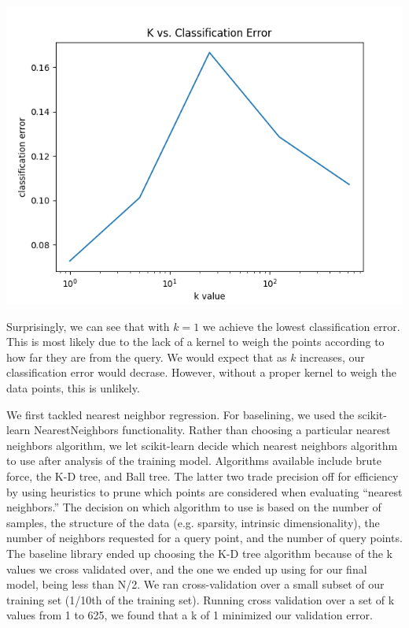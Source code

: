 \documentclass{article} %
\begin{document}
\includegraphics[width=\textwidth]{k-nn.png}

Surprisingly, we can see that with $k = 1$ we achieve the lowest classification
error. This is most likely due to the lack of a kernel to weigh the points
according to how far they are from the query. We would expect that as $k$
increases, our classification error would decrase. However, without a
proper kernel to weigh the data points, this is unlikely.

We first tackled nearest neighbor regression. For baselining, we used
the scikit-learn NearestNeighbors functionality. Rather than choosing a
particular nearest neighbors algorithm, we let scikit-learn decide which
nearest neighbors algorithm to use after analysis of the training model.
Algorithms available include brute force, the K-D tree, and Ball tree.
The latter two trade precision off for efficiency by using heuristics to
prune which points are considered when evaluating “nearest neighbors.” The
decision on which algorithm to use is based on the number of samples, the
structure of the data (e.g. sparsity, intrinsic dimensionality), the number
of neighbors requested for a query point, and the number of query points.
The baseline library ended up choosing the K-D tree algorithm because of
the k values we cross validated over, and the one we ended up using for
our final model, being less than N/2. 
We ran cross-validation over a small subset of our training set (1/10th
of the training set). Running cross validation over a set of k values from
1 to 625, we found that a k of 1 minimized our validation error. 
\end{document}
